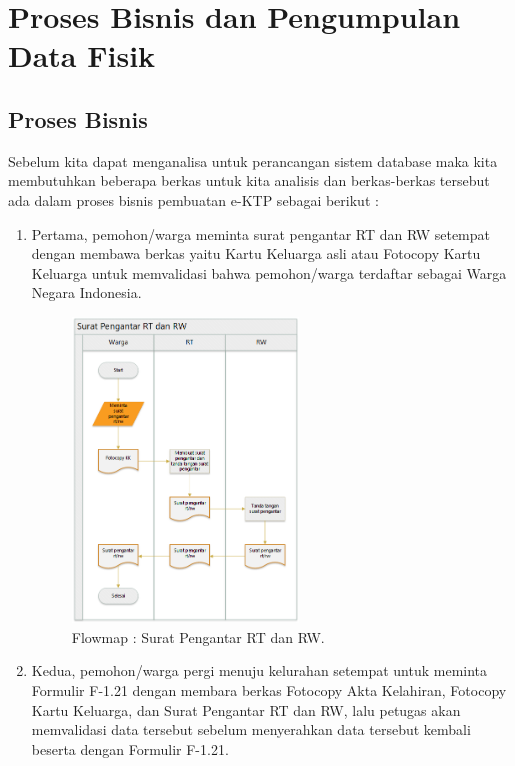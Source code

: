 \chapter{Proses Bisnis dan Pengumpulan Data Fisik}

\section{Proses Bisnis}
Sebelum kita dapat menganalisa untuk perancangan sistem database maka kita membutuhkan beberapa berkas untuk kita analisis dan berkas-berkas tersebut ada dalam proses bisnis pembuatan e-KTP sebagai berikut :
\begin{enumerate}
	\item Pertama, pemohon/warga meminta surat pengantar RT dan RW setempat dengan membawa berkas yaitu Kartu Keluarga asli atau Fotocopy Kartu Keluarga untuk memvalidasi bahwa pemohon/warga terdaftar sebagai Warga Negara Indonesia.
	\begin{figure}[H]
		\centering
		\includegraphics[width=6cm]{figures/suratf.png}
		\caption{Flowmap : Surat Pengantar RT dan RW.}	
	\end{figure}
	\item Kedua, pemohon/warga pergi menuju kelurahan setempat untuk meminta Formulir F-1.21 dengan membara berkas Fotocopy Akta Kelahiran, Fotocopy Kartu Keluarga, dan Surat Pengantar RT dan RW, lalu petugas akan memvalidasi data tersebut sebelum 			         menyerahkan data tersebut kembali beserta dengan Formulir F-1.21.
	\begin{figure}[H]
		\centering

\end{figure}
\end{enumerate}
